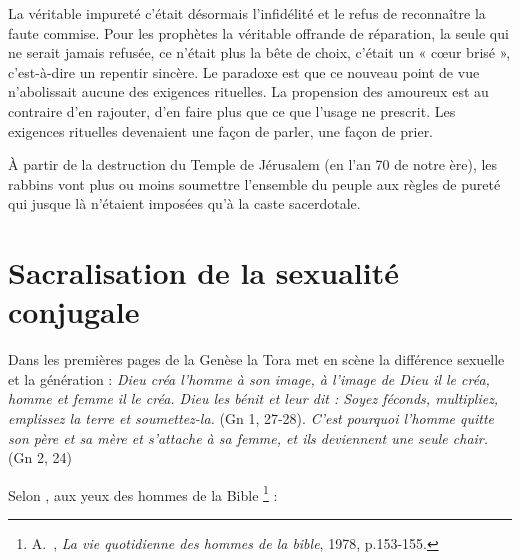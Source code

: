  La véritable impureté c'était désormais l'infidélité et le refus de reconnaître la faute commise. Pour les prophètes la véritable offrande de réparation, la seule qui ne serait jamais refusée, ce n'était plus la bête de choix, c'était un « cœur brisé », c'est-à-dire un repentir sincère. Le paradoxe est que ce nouveau point de vue n'abolissait aucune des exigences rituelles. La propension des amoureux est au contraire d'en rajouter, d'en faire plus que ce que l'usage ne prescrit. Les exigences rituelles devenaient une façon de parler, une façon de prier. 

 À partir de la destruction du Temple de Jérusalem (en l'an 70 de notre ère), les rabbins vont plus ou moins soumettre l'ensemble du peuple aux règles de pureté qui jusque là n'étaient imposées qu'à la caste sacerdotale.





\section{Sacralisation de la sexualité conjugale}

 Dans les premières pages de la Genèse la Tora met en scène la différence sexuelle et la génération : \emph{Dieu créa l'homme à son image, à l'image de Dieu il le créa, homme et femme il le créa. Dieu les bénit et leur dit : Soyez féconds, multipliez, emplissez la terre et soumettez-la.} (Gn 1, 27-28). \emph{C'est pourquoi l'homme quitte son père et sa mère et s'attache à sa femme, et ils deviennent une seule chair.} (Gn 2, 24)

 Selon , aux yeux des hommes de la Bible%
\footnote{A.~, \emph{La vie quotidienne des hommes de la bible}, 1978, p.153-155.}%
 :

